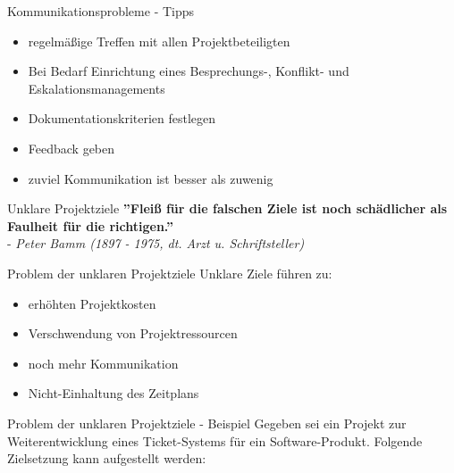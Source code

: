 \documentclass[12pt]{beamer}
\begin{document}
	\begin{frame}{Kommunikationsprobleme - Tipps}
		\begin{itemize}
			\item{regelmäßige Treffen mit allen Projektbeteiligten}
			\item{Bei Bedarf Einrichtung eines Besprechungs-, Konflikt- und Eskalationsmanagements}
			\item{Dokumentationskriterien festlegen}
			\item{Feedback geben}
			\item{zuviel Kommunikation ist besser als zuwenig}
		\end{itemize}
	\end{frame}


	\begin{frame}{Unklare Projektziele}
		\textbf{''Fleiß für die falschen Ziele ist noch schädlicher als Faulheit für die richtigen.''} \\
		- \textit{Peter Bamm (1897 - 1975, dt. Arzt u. Schriftsteller)}
	\end{frame}

	
	\begin{frame}{Problem der unklaren Projektziele}
		Unklare Ziele führen zu:
		\begin{itemize}
			\item{erhöhten Projektkosten}
			\item{Verschwendung von Projektressourcen}
			\item{noch mehr Kommunikation}
			\item{Nicht-Einhaltung des Zeitplans}
		\end{itemize}

	\end{frame}

	\begin{frame}{Problem der unklaren Projektziele - Beispiel}
		Gegeben sei ein Projekt zur Weiterentwicklung eines Ticket-Systems für ein Software-Produkt. Folgende Zielsetzung kann aufgestellt werden: \\

		
	\end{frame}
\end{document}
